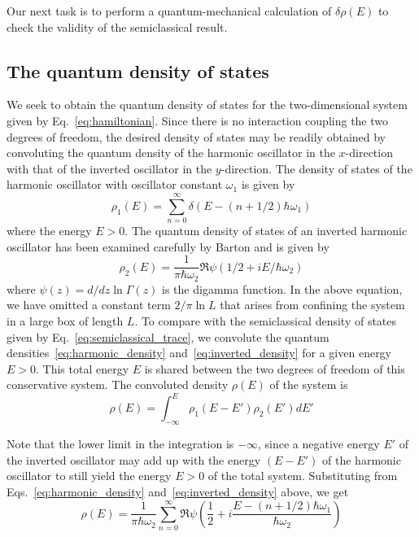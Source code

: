 \documentclass[11pt]{article}
\theoremstyle{plain}
\begin{document}
Our next task is to perform a quantum-mechanical calculation of $\delta\rho(E)$ to check the validity of the semiclassical result.

\subsection{The quantum density of states}

We seek to obtain the quantum density of states for the two-dimensional system given by Eq.~\eqref{eq:hamiltonian}. Since there is no interaction coupling the two degrees of freedom, the desired density of states may be readily obtained by convoluting the quantum density of the harmonic oscillator in the $x$-direction with that of the inverted oscillator in the $y$-direction. The density of states of the harmonic oscillator with oscillator constant $\omega_1$ is given by
\begin{equation}
\rho_1(E) = \sum_{n=0}^{\infty} \delta(E - (n + 1/2)\hbar\omega_1)
\label{eq:harmonic_density}
\end{equation}
where the energy $E > 0$. The quantum density of states of an inverted harmonic oscillator has been examined carefully by Barton \cite{barton1986} and is given by
\begin{equation}
\rho_2(E) = \frac{1}{\pi\hbar\omega_2} \Re\psi(1/2+ iE/\hbar\omega_2)
\label{eq:inverted_density}
\end{equation}
where $\psi(z) = d/dz\ln\Gamma(z)$ is the digamma function. In the above equation, we have omitted a constant term $2/\pi \ln L$ that arises from confining the system in a large box of length $L$. To compare with the semiclassical density of states given by Eq.~\eqref{eq:semiclassical_trace}, we convolute the quantum densities~\eqref{eq:harmonic_density} and~\eqref{eq:inverted_density} for a given energy $E > 0$. This total energy $E$ is shared between the two degrees of freedom of this conservative system. The convoluted density $\rho(E)$ of the system is
\begin{equation}
\rho(E) = \int_{-\infty}^{E} \rho_1(E-E')\rho_2(E') dE'
\label{eq:convolution}
\end{equation}

Note that the lower limit in the integration is $-\infty$, since a negative energy $E'$ of the inverted oscillator may add up with the energy $(E - E')$ of the harmonic oscillator to still yield the energy $E > 0$ of the total system. Substituting from Eqs.~\eqref{eq:harmonic_density} and~\eqref{eq:inverted_density} above, we get
\begin{equation}
\rho(E) = \frac{1}{\pi\hbar\omega_2} \sum_{n=0}^{\infty} \Re\psi\left(\frac{1}{2} + i\frac{E - (n+1/2)\hbar\omega_1}{\hbar\omega_2}\right)
\label{eq:quantum_density}
\end{equation}
\end{document}
